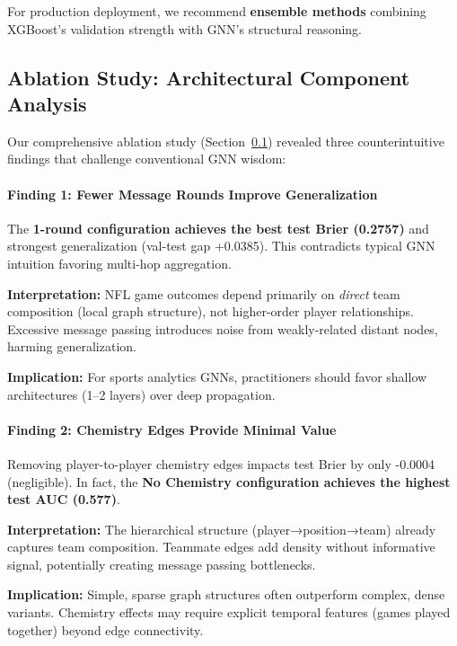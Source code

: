 For production deployment, we recommend \textbf{ensemble methods} combining XGBoost's validation strength with GNN's structural reasoning.

\subsection{Ablation Study: Architectural Component Analysis}
\label{subsec:gnn_ablation_analysis}

Our comprehensive ablation study (Section~\ref{subsec:gnn_ablation_analysis}) revealed three counterintuitive findings that challenge conventional GNN wisdom:

\paragraph{Finding 1: Fewer Message Rounds Improve Generalization}

The \textbf{1-round configuration achieves the best test Brier (0.2757)} and strongest generalization (val-test gap +0.0385). This contradicts typical GNN intuition favoring multi-hop aggregation.

\textbf{Interpretation:} NFL game outcomes depend primarily on \textit{direct} team composition (local graph structure), not higher-order player relationships. Excessive message passing introduces noise from weakly-related distant nodes, harming generalization.

\textbf{Implication:} For sports analytics GNNs, practitioners should favor shallow architectures (1--2 layers) over deep propagation.

\paragraph{Finding 2: Chemistry Edges Provide Minimal Value}

Removing player-to-player chemistry edges impacts test Brier by only -0.0004 (negligible). In fact, the \textbf{No Chemistry configuration achieves the highest test AUC (0.577)}.

\textbf{Interpretation:} The hierarchical structure (player→position→team) already captures team composition. Teammate edges add density without informative signal, potentially creating message passing bottlenecks.

\textbf{Implication:} Simple, sparse graph structures often outperform complex, dense variants. Chemistry effects may require explicit temporal features (games played together) beyond edge connectivity.

